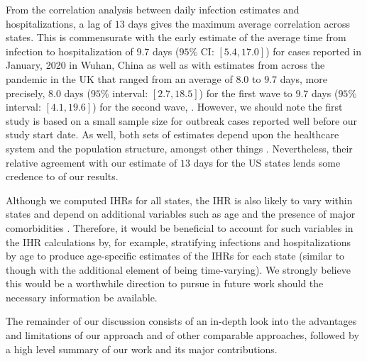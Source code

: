 \documentclass{article}
\begin{document}
From the correlation analysis between daily infection estimates and
hospitalizations, a lag of $13$ days gives the maximum average correlation
across states. This is commensurate with the early estimate of the average time
from infection to hospitalization of $9.7$ days ($95\%$ CI: $[5.4, 17.0]$) for
cases reported in January, 2020 in Wuhan, China as well as with estimates from
across the pandemic in the UK that ranged from an average of $8.0$ to $9.7$
days, more precisely, $8.0$ days ($95\%$ interval: $[2.7, 18.5]$) for the first
wave to $9.7$ days ($95\%$ interval: $[4.1, 19.6]$) for the second wave,
\citep{ward2021understanding}. However, we should note the first study is based
on a small sample size for outbreak cases reported well before our study start
date. As well, both sets of estimates depend upon the healthcare system and the
population structure, amongst other things \citep{ward2021understanding}.
Nevertheless, their relative agreement with our estimate of $13$ days for the US
states lends some credence to of our results. 

Although we computed IHRs for all states, the IHR is also likely to vary within
states and depend on additional variables such as age and the presence of major
comorbidities \citep{russell2023comorbidities}. Therefore, it would be
beneficial to account for such variables in the IHR calculations by, for
example, stratifying infections and hospitalizations by age to produce
age-specific estimates of the IHRs for each state (similar to
\citealt{fox2023disproportionate} though with the additional element of being
time-varying). We strongly believe this would be a worthwhile direction to
pursue in future work should the necessary information be available. 

The remainder of our discussion consists of an in-depth look into the advantages and
limitations of our approach and of other comparable approaches, followed by a
high level summary of our work and its major contributions. 
\end{document}
